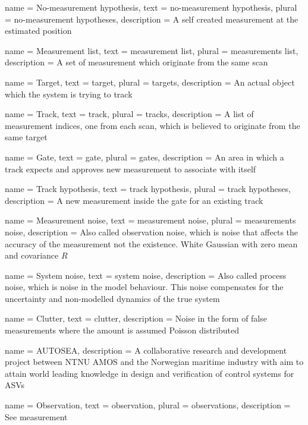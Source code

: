 {
	name 		= {No-measurement hypothesis},
	text 		= {no-measurement hypothesis},
	plural		= {no-measurement hypotheses},
	description = {A self created measurement at the estimated position}
}

{
	name 		= {Measurement list},
	text 		= {measurement list},
	plural		= {measurements list},
	description = {A set of measurement which originate from the same scan}
}

{
	name 		= Target,
	text 		= target,
	plural		= targets,
	description = {An actual object which the system is trying to track}
}

{
	name 		= Track,
	text 		= track,
	plural 		= tracks,
	description = {A list of measurement indices, one from each scan, which is believed to originate from the same target}
}

{
	name 		= Gate,
	text 		= gate,
	plural		= gates,
	description = {An area in which a track expects and approves new measurement to associate with itself}
}

{
	name 		= {Track hypothesis},
	text 		= {track hypothesis},
	plural		= {track hypotheses},
	description = {A new measurement inside the gate for an existing track}
}

{
	name 		= {Measurement noise},
	text 		= {measurement noise},
	plural		= {measurements noise},
	description = {Also called observation noise, which is noise that affects the accuracy of the measurement not the existence. White Gaussian with zero mean and covariance $R$}
}

{
	name 		= {System noise},
	text 		= {system noise}, 
	description = {Also called process noise, which is noise in the model behaviour. This noise compensates for the uncertainty and non-modelled dynamics of the true system}
}

{
	name 		= Clutter,
	text 		= clutter,
	description = {Noise in the form of false measurements where the amount is assumed Poisson distributed}
}

{
	name = {AUTOSEA},
	description = {A collaborative research and development project between NTNU AMOS  and the Norwegian maritime industry with aim to attain world leading knowledge in design and verification of control systems for ASVs}
}

{
	name 		= Observation,
	text 		= observation,
	plural 		= observations,
	description = {See \Gls{measurement}}
}